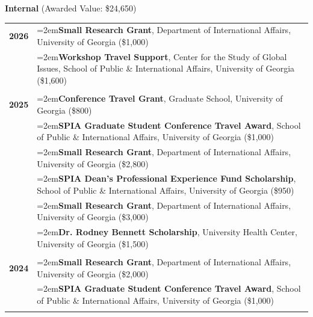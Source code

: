\documentclass[letterpaper,12pt]{article}
\begin{document}
\textbf{Internal} (Awarded Value: \$24,650)
\begin{xltabular}{\dimexpr\textwidth-0in}{p{1.5in}X}
\textbf{2026}          		& \hangindent=2em\textbf{Small Research Grant}, Department of International Affairs, University of \mbox{Georgia} (\$1,000)\\
			     		
					& \hangindent=2em\textbf{Workshop Travel Support}, Center for the Study of Global Issues, School of Public \& International Affairs, University of Georgia (\$1,600)\\ \\

\textbf{2025}          		& \hangindent=2em\textbf{Conference Travel Grant}, Graduate School, University of Georgia (\$800)\\
			     		& \hangindent=2em\textbf{SPIA Graduate Student Conference Travel Award}, School of Public \& \mbox{International} Affairs, University of Georgia (\$1,000)\\
			     
			     		& \hangindent=2em\textbf{Small Research Grant}, Department of International Affairs, University of \mbox{Georgia} (\$2,800)\\
			     
                              		& \hangindent=2em\textbf{SPIA Dean's Professional Experience Fund Scholarship}, School of Public \& \mbox{International} Affairs, University of Georgia (\$950)\\
                              
                             		& \hangindent=2em\textbf{Small Research Grant}, Department of International Affairs, University of \mbox{Georgia} (\$3,000) \\
                              
                              		& \hangindent=2em\textbf{Dr. Rodney Bennett Scholarship}, University Health Center, University of Georgia (\$1,500)\\ \\
                              
\textbf{2024}          		& \hangindent=2em\textbf{Small Research Grant}, Department of International Affairs, University of \mbox{Georgia} (\$2,000)\\

                              		& \hangindent=2em\textbf{SPIA Graduate Student Conference Travel Award}, School of Public \& \mbox{International} Affairs, University of Georgia (\$1,000)\\ \\
                              

\end{xltabular}
\end{document}
